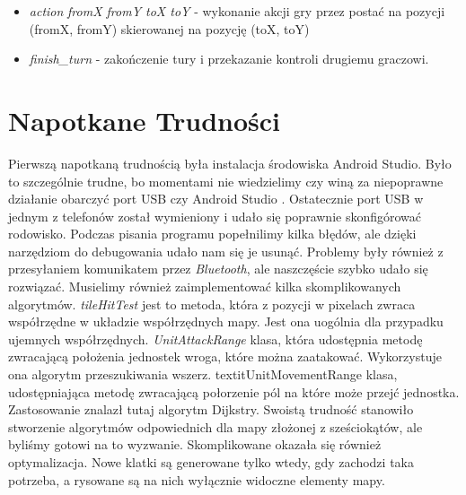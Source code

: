 \documentclass[paper=a4, fontsize=11pt]{scrartcl} %
\numberwithin{equation}{section} %
\numberwithin{figure}{section} %
\numberwithin{table}{section} %
\begin{document}
\begin{itemize}

  \item \emph{action} \textit{fromX fromY toX toY} - wykonanie akcji gry przez
    postać na pozycji (fromX, fromY) skierowanej na pozycję (toX, toY)

  \item \emph{finish\_turn} - zakończenie tury i przekazanie kontroli drugiemu graczowi.

\end{itemize}

\section{Napotkane Trudności}
Pierwszą napotkaną trudnością była instalacja środowiska Android Studio. Było to szczególnie trudne, bo momentami nie wiedzielimy czy winą za niepoprawne działanie obarczyć port USB czy Android Studio . Ostatecznie port USB w jednym z telefonów został wymieniony i udało się poprawnie skonfigórować rodowisko. Podczas pisania programu popełnilimy kilka błędów, ale dzięki narzędziom do debugowania udało nam się je usunąć. Problemy były również z przesyłaniem komunikatem przez \textit{Bluetooth}, ale naszczęście szybko udało się rozwiązać. Musielimy również zaimplementować kilka skomplikowanych algorytmów. \textit{tileHitTest} jest to metoda, która z pozycji w pixelach zwraca współrzędne w układzie współrzędnych mapy. Jest ona uogólnia dla przypadku ujemnych współrzędnych. \textit{UnitAttackRange} klasa, która udostępnia metodę zwracającą położenia jednostek wroga, które można zaatakować. Wykorzystuje ona algorytm przeszukiwania wszerz.  textit{UnitMovementRange} klasa, udostępniająca metodę zwracającą połorzenie pól na które może przejć jednostka. Zastosowanie znalazł tutaj algorytm Dijkstry. Swoistą trudność stanowiło stworzenie algorytmów odpowiednich dla mapy złożonej z sześciokątów, ale byliśmy gotowi na to wyzwanie. Skomplikowane okazała się również optymalizacja. Nowe klatki są generowane tylko wtedy, gdy zachodzi taka potrzeba, a rysowane są na nich wyłącznie widoczne elementy mapy.

\end{document}
